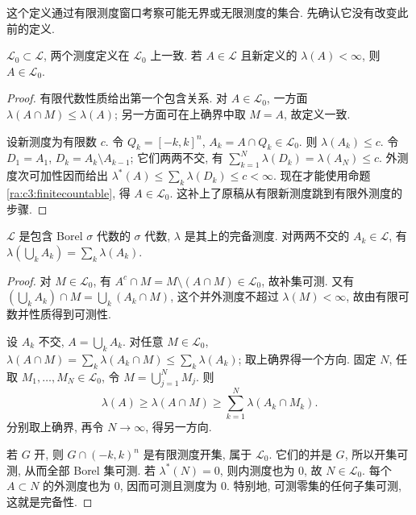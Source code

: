 这个定义通过有限测度窗口考察可能无界或无限测度的集合. 先确认它没有改变此前的定义.

\begin{proposition}\label{ra:c3:extension}
$\mathcal L_0\subset\mathcal L$, 两个测度定义在 $\mathcal L_0$ 上一致. 若 $A\in\mathcal L$ 且新定义的 $\lambda(A)<\infty$, 则 $A\in\mathcal L_0$.
\end{proposition}
\begin{proof}
有限代数性质给出第一个包含关系. 对 $A\in\mathcal L_0$, 一方面 $\lambda(A\cap M)\le\lambda(A)$; 另一方面可在上确界中取 $M=A$, 故定义一致.

设新测度为有限数 $c$. 令 $Q_k=[-k,k]^n$, $A_k=A\cap Q_k\in\mathcal L_0$. 则 $\lambda(A_k)\le c$. 令 $D_1=A_1$, $D_k=A_k\setminus A_{k-1}$; 它们两两不交, 有 $\sum_{k=1}^N\lambda(D_k)=\lambda(A_N)\le c$. 外测度次可加性因而给出 $\lambda^*(A)\le\sum_k\lambda(D_k)\le c<\infty$. 现在才能使用命题 \ref{ra:c3:finitecountable}, 得 $A\in\mathcal L_0$. 这补上了原稿从有限新测度跳到有限外测度的步骤.
\end{proof}

\begin{theorem}\label{ra:c3:measure}
$\mathcal L$ 是包含 Borel $\sigma$ 代数的 $\sigma$ 代数, $\lambda$ 是其上的完备测度. 对两两不交的 $A_k\in\mathcal L$, 有 $\lambda(\bigcup_kA_k)=\sum_k\lambda(A_k)$.
\end{theorem}
\begin{proof}
对 $M\in\mathcal L_0$, 有 $A^c\cap M=M\setminus(A\cap M)\in\mathcal L_0$, 故补集可测. 又有 $(\bigcup_kA_k)\cap M=\bigcup_k(A_k\cap M)$, 这个并外测度不超过 $\lambda(M)<\infty$, 故由有限可数并性质得到可测性.

设 $A_k$ 不交, $A=\bigcup_kA_k$. 对任意 $M\in\mathcal L_0$, $\lambda(A\cap M)=\sum_k\lambda(A_k\cap M)\le\sum_k\lambda(A_k)$; 取上确界得一个方向. 固定 $N$, 任取 $M_1,\ldots,M_N\in\mathcal L_0$, 令 $M=\bigcup_{j=1}^NM_j$. 则
\[
 \lambda(A)\ge\lambda(A\cap M)
 \ge\sum_{k=1}^N\lambda(A_k\cap M_k).
\]
分别取上确界, 再令 $N\to\infty$, 得另一方向.

若 $G$ 开, 则 $G\cap(-k,k)^n$ 是有限测度开集, 属于 $\mathcal L_0$. 它们的并是 $G$, 所以开集可测, 从而全部 Borel 集可测. 若 $\lambda^*(N)=0$, 则内测度也为 $0$, 故 $N\in\mathcal L_0$. 每个 $A\subset N$ 的外测度也为 $0$, 因而可测且测度为 $0$. 特别地, 可测零集的任何子集可测, 这就是完备性.
\end{proof}

